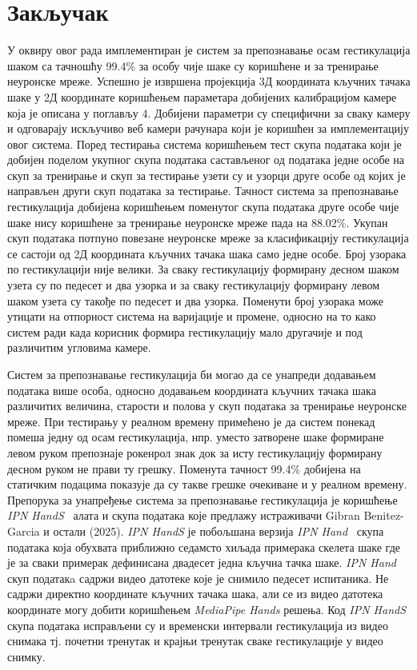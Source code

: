 \documentclass[master]{finthesis}
\begin{document}
\section{Закључак}

У оквиру овог рада имплементиран је систем за препознавање осам гестикулација шаком са тачношћу 99.4\% за особу чије шаке су коришћене и за тренирање неуронске мреже. Успешно је извршена пројекција 3Д координата кључних тачака шаке у 2Д координате коришћењем параметара добијених калибрацијом камере која је описана у поглављу 4. Добијени параметри су специфични за сваку камеру и одговарају искључиво веб камери рачунара који је коришћен за имплементацију овог система. Поред тестирања система коришћењем тест скупа података који је добијен поделом укупног скупа података састављеног од података једне особе на скуп за тренирање и скуп за тестирање узети су и узорци друге особе од којих је направљен други скуп података за тестирање. Тачност система за препознавање гестикулација добијена коришћењем поменутог скупа података друге особе чије шаке нису коришћене за тренирање неуронске мреже пада на 88.02\%. Укупан скуп података потпуно повезане неуронске мреже за класификацију гестикулација се састоји од 2Д координата кључних тачака шака само једне особе. Број узорака по гестикулацији није велики. За сваку гестикулацију формирану десном шаком узета су по педесет и два узорка и за сваку гестикулацију формирану левом шаком узета су такође по педесет и два узорка. Поменути број узорака може утицати на отпорност система на варијације и промене, односно на то како систем ради када корисник формира гестикулацију мало другачије и под различитим угловима камере.

Систем за препознавање гестикулација би могао да се унапреди додавањем података више особа, односно додавањем координата кључних тачака шака различитих величина, старости и полова у скуп података за тренирање неуронске мреже. При тестирању у реалном времену примећено је да систем понекад помеша једну од осам гестикулација, нпр. уместо затворене шаке формиране левом руком препознаје рокенрол знак док за исту гестикулацију формирану десном руком не прави ту грешку. Поменута тачност 99.4\% добијена на статичким подацима показује да су такве грешке очекиване и у реалном времену. Препорука за унапређење система за препознавање гестикулација је коришћење \textit{IPN HandS}~\cite{app15116321} алата и скупа података које предлажу истраживачи Gibran Benitez-Garcia и остали (2025). \textit{IPN HandS} је побољшана верзија \textit{IPN Hand}~\cite{bega2020IPNhand} скупа података која обухвата приближно седамсто хиљада примерака скелета шаке где је за сваки примерак дефинисана двадесет једна кључна тачка шаке. \textit{IPN Hand} скуп податакa садржи видео датотеке које је снимило педесет испитаника. Не садржи директно координате кључних тачака шака, али се из видео датотека координате могу добити коришћењем \textit{MediaPipe Hands} решења. Код \textit{IPN HandS} скупа података исправљени су и временски интервали гестикулација из видео снимака тј. почетни тренутак и крајњи тренутак сваке гестикулације у видео снимку. 
\end{document}
